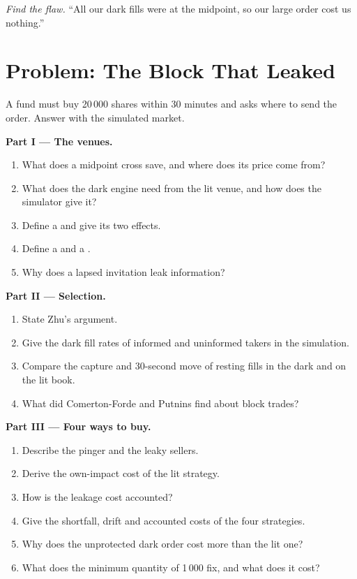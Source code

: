 \begin{exercise}[$\star\star\star$]\label{exo:mx:dark-pools-and-blocks:8}
\emph{Find the flaw.} ``All our dark fills were at the midpoint, so our large order cost us nothing.''
\end{exercise}

\section{Problem: The Block That Leaked}

\begin{problem}\label{pb:mx:dark-pools-and-blocks:1}
A fund must buy 20\,000 shares within 30 minutes and asks where to send the order. Answer with the simulated market.

\medskip\noindent\textbf{Part I --- The venues.}
\begin{enumerate}
\item What does a midpoint cross save, and where does its price come from?
\item What does the dark engine need from the lit venue, and how does the simulator give it?
\item Define a  and give its two effects.
\item Define a  and a .
\item Why does a lapsed invitation leak information?
\end{enumerate}

\medskip\noindent\textbf{Part II --- Selection.}
\begin{enumerate}[resume]
\item State Zhu's argument.
\item Give the dark fill rates of informed and uninformed takers in the simulation.
\item Compare the capture and 30-second move of resting fills in the dark and on the lit book.
\item What did Comerton-Forde and Putnins find about block trades?
\end{enumerate}

\medskip\noindent\textbf{Part III --- Four ways to buy.}
\begin{enumerate}[resume]
\item Describe the pinger and the leaky sellers.
\item Derive the own-impact cost of the lit strategy.
\item How is the leakage cost accounted?
\item Give the shortfall, drift and accounted costs of the four strategies.
\item Why does the unprotected dark order cost more than the lit one?
\item What does the minimum quantity of 1\,000 fix, and what does it cost?
\end{enumerate}


\end{problem}
